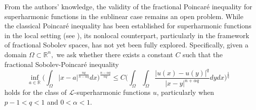 \documentclass[12pt]{amsart}
\newcommand{\R}{\mathbb{R}}
\numberwithin{equation}{section}
\theoremstyle{plain}
\newtheorem{Lem}[Thm]{Lemma}
\theoremstyle{definition}
\theoremstyle{remark}
\begin{document}
From the authors' knowledge, the validity of the fractional Poincar\'{e} inequality for superharmonic functions in the sublinear case remains an open problem. While the classical Poincar\'{e} inequality has been established for superharmonic functions in the local setting (see \cite{CP}), its nonlocal counterpart, particularly in the framework of fractional Sobolev spaces, has not yet been fully explored. Specifically, given a domain $\Omega\subset\R^{n},$ we ask whether there exists a constant $C$ such that the fractional Sobolev-Poincar\'{e} inequality 
\[
\inf_{a\in\mathbb{R}}\Bigg( \int_{\Omega}|x-a|^{\frac{nq}{n-\alpha q}}dx\Bigg)^{\frac{n-\alpha q}{nq}} \leq C\Bigg(\int_{\Omega}\int_{\Omega} \frac{|u(x)-u(y)|^{q}}{|x-y|^{n+\alpha q}} dy dx\Bigg)^{\frac{1}{q}}
\]
holds for the class of $\mathcal{L}$-superharmonic functions $u$, particularly when $p-1<q<1$ and $0<\alpha<1.$









\end{document}
